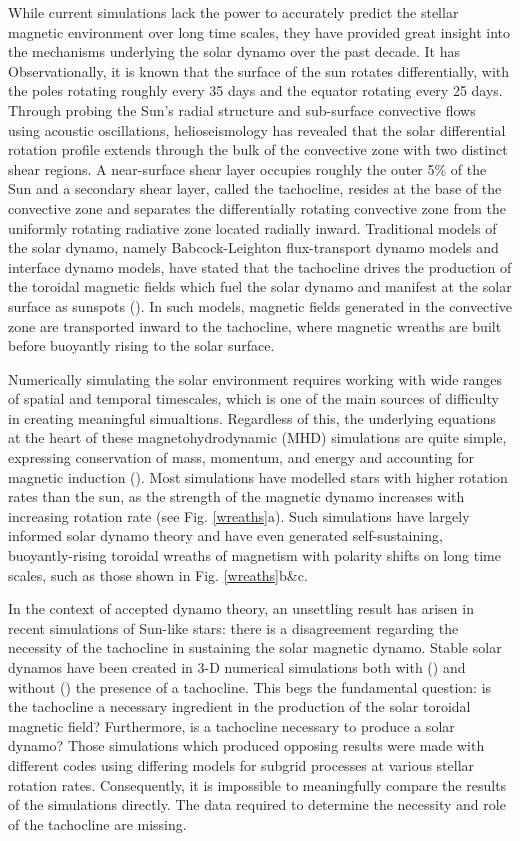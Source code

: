 \documentclass[aasms,12pt]{article}
\begin{document}
While current simulations lack the power to accurately 
predict the stellar magnetic environment 
over long time scales, they have provided great insight into the mechanisms
underlying the solar dynamo over the past decade.  
It has 
Observationally, it is known that the surface of the sun rotates differentially,
with the poles rotating roughly every 35 days and the equator rotating every 25
days.
Through probing the Sun's
radial structure and sub-surface convective flows using acoustic oscillations,
helioseismology
has revealed that the solar differential rotation profile extends through the
bulk of the convective zone with two distinct shear regions.  A near-surface
shear layer occupies roughly the outer 5\% of the Sun and a secondary shear
layer, called the tachocline, resides at the base of the convective zone
and separates the differentially rotating convective zone from the uniformly
rotating radiative zone located radially inward.  
Traditional models of the solar dynamo, namely Babcock-Leighton flux-transport
dynamo models and interface dynamo models, have stated that the
tachocline drives the production of the toroidal magnetic   
fields which fuel the solar dynamo and manifest at the solar surface as
sunspots (\citealt{Toomre2009}).  In such models, magnetic fields generated
in the convective zone are transported inward to the tachocline, where
magnetic wreaths are built before buoyantly 
rising to the solar surface.

Numerically simulating the solar environment requires working with wide ranges
of spatial and temporal timescales, which is one of the main sources of
difficulty in creating meaningful simualtions.  Regardless of this, the
underlying equations at the heart of these magnetohydrodynamic (MHD) simulations
are quite simple, expressing conservation of mass, momentum, and energy and
accounting for magnetic induction (\citealt{Charbonneau2014}).  Most simulations
have modelled stars with higher rotation rates than the sun, as the strength
of the magnetic dynamo increases with increasing rotation rate (see Fig.
\ref{wreaths}a).  Such simulations
have largely informed solar dynamo theory and have even generated 
self-sustaining, buoyantly-rising toroidal wreaths of magnetism with polarity
shifts on long time scales,
such as those shown in Fig. \ref{wreaths}b\&c.  

In the context of accepted dynamo theory, an unsettling result has arisen
in recent simulations of Sun-like stars: there is a disagreement
regarding the necessity of the tachocline
in sustaining the solar magnetic dynamo.  Stable solar dynamos have been
created in 3-D numerical simulations both with
(\citealt{ghizaru2010, racine2011})
and without (\citealt{brown2011, nelson2013}) the presence of a tachocline. This
begs the fundamental question: is the tachocline a necessary ingredient in the
production of the solar toroidal magnetic field?  Furthermore, is a tachocline
necessary to produce a solar dynamo?  Those simulations which produced opposing
results were made with different codes using differing models for subgrid
processes at various stellar rotation rates.  Consequently, it is impossible to
meaningfully compare the results of the simulations directly.  The data required
to determine the necessity and role of the tachocline are missing.
\end{document}
